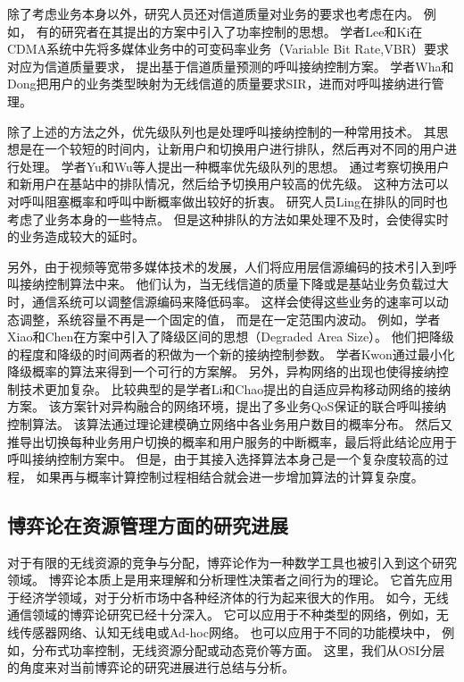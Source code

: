 除了考虑业务本身以外，研究人员还对信道质量对业务的要求也考虑在内。 例如，
有的研究者在其提出的方案中引入了功率控制的思想\cite{LiuZhang:2002}\cite{ZhangFang:2006}。
学者Lee和Ki在CDMA系统中先将多媒体业务中的可变码率业务（Variable Bit Rate,VBR）要求对应为信道质量要求，
提出基于信道质量预测的呼叫接纳控制方案\cite{Lee:2004}。
学者Wha和Dong把用户的业务类型映射为无线信道的质量要求SIR，进而对呼叫接纳进行管理\cite{JeonJeong:2001}\cite{Wha:2002}。

除了上述的方法之外，优先级队列也是处理呼叫接纳控制的一种常用技术。
其思想是在一个较短的时间内，让新用户和切换用户进行排队，然后再对不同的用户进行处理。
学者Yu和Wu等人提出一种概率优先级队列的思想。
通过考察切换用户和新用户在基站中的排队情况，然后给予切换用户较高的优先级。
这种方法可以对呼叫阻塞概率和呼叫中断概率做出较好的折衷\cite{Yu:2006}。
研究人员Ling在排队的同时也考虑了业务本身的一些特点\cite{Ling:2009}。
但是这种排队的方法如果处理不及时，会使得实时的业务造成较大的延时。


另外，由于视频等宽带多媒体技术的发展，人们将应用层信源编码的技术引入到呼叫接纳控制算法中来。
他们认为，当无线信道的质量下降或是基站业务负载过大时，通信系统可以调整信源编码来降低码率。
这样会使得这些业务的速率可以动态调整，系统容量不再是一个固定的值，
而是在一定范围内波动。
例如，学者Xiao和Chen在方案中引入了降级区间的思想（Degraded Area Size）\cite{XiaoChen:2000}。
他们把降级的程度和降级的时间两者的积做为一个新的接纳控制参数。
学者Kwon通过最小化降级概率的算法来得到一个可行的方案解\cite{KwonChoi:1999}。
另外，异构网络的出现也使得接纳控制技术更加复杂。
比较典型的是学者Li和Chao提出的自适应异构移动网络的接纳方案\cite{LiChao:2007}。
该方案针对异构融合的网络环境，提出了多业务QoS保证的联合呼叫接纳控制算法。
该算法通过理论建模确立网络中各业务用户数目的概率分布。
然后又推导出切换每种业务用户切换的概率和用户服务的中断概率，最后将此结论应用于呼叫接纳控制方案中。 
但是，由于其接入选择算法本身己是一个复杂度较高的过程，
如果再与概率计算控制过程相结合就会进一步增加算法的计算复杂度。



\subsection{博弈论在资源管理方面的研究进展}
对于有限的无线资源的竞争与分配，博弈论作为一种数学工具也被引入到这个研究领域。
博弈论本质上是用来理解和分析理性决策者之间行为的理论。
它首先应用于经济学领域，对于分析市场中各种经济体的行为起来很大的作用。
如今，无线通信领域的博弈论研究已经十分深入。
它可以应用于不种类型的网络，例如，无线传感器网络、认知无线电或Ad-hoc网络\cite{MachadoTekinay:2008}\cite{WangWu:2010}\cite{Srivastava:2005}。
也可以应用于不同的功能模块中，
例如，分布式功率控制，无线资源分配或动态竞价等方面\cite{AlpcanBasar:2006}\cite{Senqupta:2009}。
这里，我们从OSI分层的角度来对当前博弈论的研究进展进行总结与分析。

